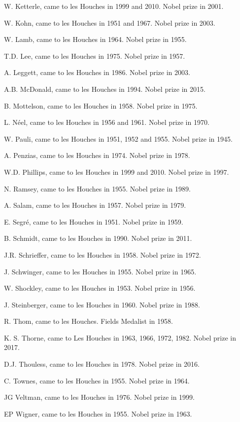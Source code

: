 \begin{itemize}
\begin{multicols}{2}
{W. Ketterle,
came to les Houches in 1999 and 2010. Nobel prize in 2001.

W. Kohn,
came to les Houches in 1951 and 1967. Nobel prize in 2003.

W. Lamb,
came to les Houches in 1964. Nobel prize in 1955.

T.D. Lee,
came to les Houches in 1975. Nobel prize in 1957.

A. Leggett,
came to les Houches in 1986. Nobel prize in 2003.

A.B. McDonald,
came to les Houches in 1994. Nobel prize in 2015.

B. Mottelson,
came to les Houches in 1958. Nobel prize in 1975.

L. Néel,
came to les Houches in 1956 and 1961. Nobel prize in 1970.

W. Pauli,
came to les Houches in 1951, 1952 and 1955. Nobel prize in 1945.

A. Penzias,
came to les Houches in 1974. Nobel prize in 1978.

W.D. Phillips,
came to les Houches in 1999 and 2010. Nobel prize in 1997.

N. Ramsey,
came to les Houches in 1955. Nobel prize in 1989.

A. Salam,
came to les Houches in 1957. Nobel prize in 1979.

E. Segré,
came to les Houches in 1951. Nobel prize in 1959.

B. Schmidt,
came to les Houches in 1990. Nobel prize in 2011.

J.R. Schrieffer,
came to les Houches in 1958. Nobel prize in 1972.

J. Schwinger,
came to les Houches in 1955. Nobel prize in 1965.

W. Shockley,
came to les Houches in 1953. Nobel prize in 1956.

J. Steinberger,
came to les Houches in 1960. Nobel prize in 1988.

R. Thom,
came to les Houches. Fields Medalist in 1958.

K. S. Thorne,
came to Les Houches in 1963, 1966, 1972, 1982. Nobel prize in 2017.

D.J. Thouless,
came to les Houches in 1978. Nobel prize in 2016.

C. Townes,
came to les Houches in 1955. Nobel prize in 1964.

JG Veltman,
came to les Houches in 1976. Nobel prize in 1999.

EP Wigner,
came to les Houches in 1955. Nobel prize in 1963.

}
\end{multicols}
\end{itemize}
